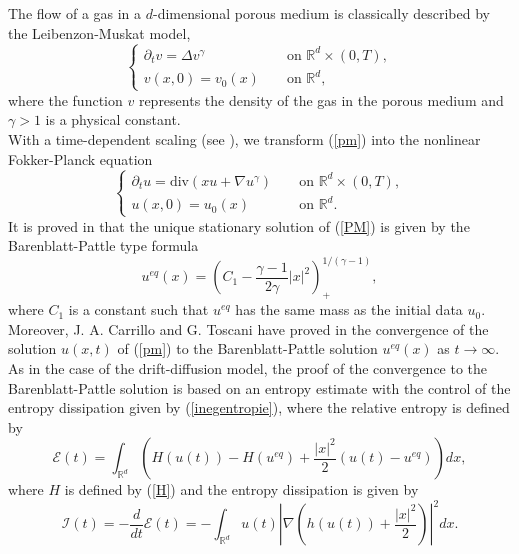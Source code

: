 \documentclass[smallextended]{svjour3}
\def\pa{\partial}
\def\pa{\partial}
\begin{document}
The flow of a gas in a $d$-dimensional porous medium is classically described by the Leibenzon-Muskat model, 
\begin{equation}
\left\{\begin{array}{lcl} \pa_{t}v=\Delta v^{\gamma} & & \text{ on } \mathbb{R}^{d}\times(0,T),\\ v(x,0)=v_{0}(x) & & \text{ on }  \mathbb{R}^{d},\end{array}\right.
\label{pm}
\end{equation}
where the function $v$ represents the density of the gas in the porous medium and $\gamma>1$ is a physical constant.\\
With a time-dependent scaling (see \cite{Carrillo2000}), we transform (\ref{pm}) into the nonlinear Fokker-Planck equation
\begin{equation}
\left\{\begin{array}{lcl} \pa_{t}u=\text{div}(xu+\nabla u^{\gamma}) & & \text{ on } \mathbb{R}^{d}\times(0,T),\\
 u(x,0)=u_{0}(x)& & \text{ on }  \mathbb{R}^{d}.\end{array}\right.
\label{PM}
\end{equation}
It is proved in \cite{Carrillo2000} that the unique stationary solution of (\ref{PM}) is given by the Barenblatt-Pattle type formula
\begin{equation}
u^{eq}(x)=\left(C_{1}-\frac{\gamma -1}{2\gamma}|x|^{2}\right)_{+}^{1/(\gamma -1)},
\label{barenblatt}
\end{equation}
where $C_{1}$ is a constant such that $u^{eq}$ has the same mass as the initial data $u_{0}$.\\ 
Moreover, J. A. Carrillo and G. Toscani have proved in \cite{Carrillo2000} the convergence of the solution $u(x,t)$ of (\ref{pm}) to the Barenblatt-Pattle solution $u^{eq}(x)$ as $t \rightarrow \infty$. As in the case of the drift-diffusion model, the proof of the convergence to the Barenblatt-Pattle solution is based on an entropy estimate with the control of the entropy dissipation given by (\ref{inegentropie}), where the relative entropy is defined by
\begin{equation}
\mathcal{E}(t)=\int_{\mathbb{R}^{d}}\left(H(u(t))-H(u^{eq})+\frac{|x|^{2}}{2}\left(u(t)-u^{eq}\right)\right)dx,
\label{Econtinupm}
\end{equation}
where $H$ is defined by (\ref{H}) and the entropy dissipation is given by
\begin{equation}
\mathcal{I}(t)=-\frac{d}{dt}\mathcal{E}(t)=-\int_{\mathbb{R}^{d}}u(t)\left\vert \nabla\left(h(u(t))+\frac{|x|^{2}}{2}\right) \right\vert^{2}dx.
\label{Icontinupm}
\end{equation}
\end{document}
